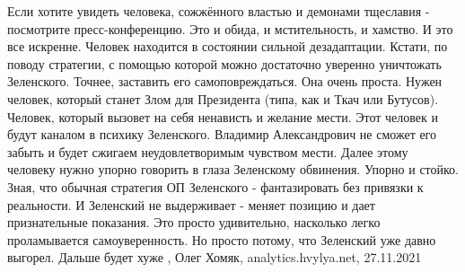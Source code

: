 Если хотите увидеть человека, сожжённого властью и демонами тщеславия -
посмотрите пресс-конференцию. Это и обида, и мстительность, и хамство. И это
все искренне. Человек находится в состоянии сильной дезадаптации.
Кстати, по поводу стратегии, с помощью которой можно достаточно уверенно
уничтожать Зеленского. Точнее, заставить его самоповреждаться. Она очень
проста. Нужен человек, который станет Злом для Президента (типа, как и Ткач или
Бутусов). Человек, который вызовет на себя ненависть и желание мести. Этот
человек и будут каналом в психику Зеленского. Владимир Александрович не сможет
его забыть и будет сжигаем неудовлетворимым чувством мести. Далее этому
человеку нужно упорно говорить в глаза Зеленскому обвинения. Упорно и стойко.
Зная, что обычная стратегия ОП Зеленского - фантазировать без привязки к
реальности. И Зеленский не выдерживает - меняет позицию и дает признательные
показания. Это просто удивительно, насколько легко проламывается
самоуверенность. Но просто потому, что Зеленский уже давно выгорел. Дальше
будет хуже
, 
Олег Хомяк, analytics.hvylya.net, 27.11.2021
